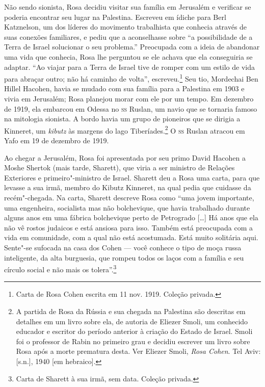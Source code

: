 Não sendo sionista, Rosa decidiu visitar sua família em Jerusalém e
verificar se poderia encontrar seu lugar na Palestina. Escreveu em
ídiche para Berl Katznelson, um dos líderes do movimento trabalhista
que conhecia através de suas conexões familiares, e pediu que a
aconselhasse sobre ``a possibilidade de a Terra de Israel solucionar o
seu problema.'' Preocupada com a ideia de abandonar uma vida que
conhecia, Rosa lhe perguntou se ele achava que ela conseguiria se
adaptar. ``Ao viajar para a Terra de Israel tive de romper com um estilo
de vida para abraçar outro; não há caminho de volta'', escreveu.\footnote{Carta de Rosa Cohen
escrita em 11 nov. 1919. Coleção privada.} Seu tio, Mordechai Ben
Hillel Hacohen, havia se mudado com sua família para a Palestina em 1903
e vivia em Jerusalém; Rosa planejou morar com ele por um tempo. Em
dezembro de 1919, ela embarcou em Odessa no \textsc{ss} Ruslan, um navio
que se tornaria famoso na mitologia sionista. A bordo havia um grupo de
pioneiros que se dirigia a Kinneret, um \emph{kibutz} às margens do lago
Tiberíades.\footnote{A partida de Rosa da Rússia e sua chegada na Palestina são
descritas em detalhes em um livro sobre ela, de autoria de Eliezer Smoli,
um conhecido educador e escritor do período anterior à criação do Estado
de Israel. Smoli foi o professor de Rabin no primeiro grau e decidiu
escrever um livro sobre Rosa após a morte prematura desta. Ver Eliezer
Smoli, \emph{Rosa Cohen}. Tel Aviv: {[}s.n.{]}, 1940 {[}em hebraico{]}.} 
O \textsc{ss} Ruslan atracou em Yafo em 19 de dezembro de 1919.

Ao chegar a Jerusalém, Rosa foi apresentada por seu primo David Hacohen
a Moshe Shertok (mais tarde, Sharett), que viria a ser ministro de
Relações Exteriores e primeiro"-ministro de Israel. Sharett deu a Rosa
uma carta, para que levasse a sua irmã, membro do Kibutz Kinneret, na
qual pedia que cuidasse da recém"-chegada. Na carta, Sharett descreve Rosa
como ``uma jovem importante, uma engenheira, socialista mas não
bolchevique, que havia trabalhado durante alguns anos em uma fábrica
bolchevique perto de Petrogrado {[}\ldots{}{]} Há anos que ela não vê rostos judaicos
e está ansiosa para isso. Também está preocupada com a vida em
comunidade, com a qual não está acostumada. Está muito solitária aqui. Sente"-se
sufocada na casa dos Cohen --- você conhece o tipo de moça russa
inteligente, da alta burguesia, que rompeu todos os laços com a família
e seu círculo social e não mais os tolera''.\footnote{Carta de Sharett à sua irmã, sem data. Coleção privada.}

